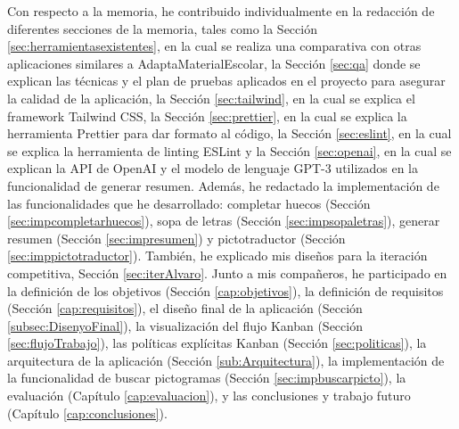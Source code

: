 Con respecto a la memoria, he contribuido individualmente en la redacción de diferentes secciones de la memoria, tales como la Sección \ref{sec:herramientasexistentes}, en la cual se realiza una comparativa con otras aplicaciones similares a AdaptaMaterialEscolar, la Sección \ref{sec:qa} donde se explican las técnicas y el plan de pruebas aplicados en el proyecto para asegurar la calidad de la aplicación, la Sección \ref{sec:tailwind}, en la cual se explica el framework Tailwind CSS, la Sección \ref{sec:prettier}, en la cual se explica la herramienta Prettier para dar formato al código, la Sección \ref{sec:eslint}, en la cual se explica la herramienta de linting ESLint y la Sección \ref{sec:openai}, en la cual se explican la API de OpenAI y el modelo de lenguaje GPT-3 utilizados en la funcionalidad de generar resumen. Además, he redactado la implementación de las funcionalidades que he desarrollado: completar huecos (Sección \ref{sec:impcompletarhuecos}), sopa de letras (Sección \ref{sec:impsopaletras}), generar resumen (Sección \ref{sec:impresumen}) y pictotraductor (Sección \ref{sec:imppictotraductor}). También, he explicado mis diseños para la iteración competitiva, Sección \ref{sec:iterAlvaro}. Junto a mis compañeros, he participado en la definición de los objetivos (Sección \ref{cap:objetivos}), la definición de requisitos (Sección \ref{cap:requisitos}), el diseño final de la aplicación (Sección \ref{subsec:DisenyoFinal}), la visualización del flujo Kanban (Sección \ref{sec:flujoTrabajo}), las políticas explícitas Kanban (Sección \ref{sec:politicas}), la arquitectura de la aplicación (Sección \ref{sub:Arquitectura}), la implementación de la funcionalidad de buscar pictogramas (Sección \ref{sec:impbuscarpicto}), la evaluación (Capítulo \ref{cap:evaluacion}), y las conclusiones y trabajo futuro (Capítulo \ref{cap:conclusiones}).

